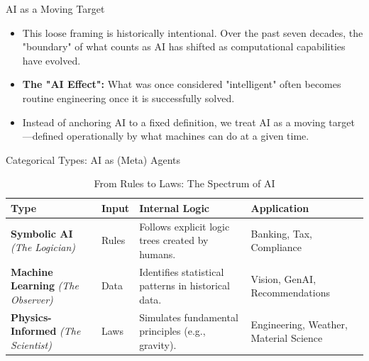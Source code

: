 \documentclass[german,10pt]{beamer}
\begin{document}
\begin{frame}{AI as a Moving Target}
    \justifying
    \begin{itemize}
        \item This loose framing is historically intentional. Over the past seven decades, the "boundary" of what counts as AI has shifted as computational capabilities have evolved.
        \item \textbf{The "AI Effect":} What was once considered "intelligent" often becomes routine engineering once it is successfully solved.
        \item Instead of anchoring AI to a fixed definition, we treat AI as a moving target—defined operationally by what machines can do at a given time.
    \end{itemize}
\end{frame}

\begin{frame}{Categorical Types: AI as (Meta) Agents}
    \justifying
\begin{table}
        \centering
        \footnotesize %
        \renewcommand{\arraystretch}{1.4} %
        
        \begin{tabular}{p{2.2cm} p{1.2cm} p{3.5cm} p{2.8cm}}
            \toprule
            \textbf{Type} & \textbf{Input} & \textbf{Internal Logic} & \textbf{Application} \\
            \midrule
            
            \textbf{Symbolic AI} \newline \textit{(The Logician)} 
            & Rules 
            & Follows explicit logic trees created by humans. 
            & Banking, Tax, Compliance \\
            \midrule
            
            \textbf{Machine Learning} \newline \textit{(The Observer)} 
            & Data 
            & Identifies statistical patterns in historical data. 
            & Vision, GenAI, Recommendations \\
            \midrule
            
            \textbf{Physics-Informed} \newline \textit{(The Scientist)} 
            & Laws 
            & Simulates fundamental principles (e.g., gravity). 
            & Engineering, Weather, Material Science \\
            \bottomrule
        \end{tabular}
        
        \caption{From Rules to Laws: The Spectrum of AI}
    \end{table}
\end{frame}
\end{document}
